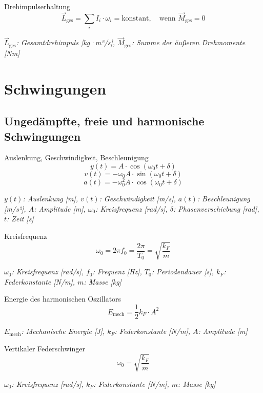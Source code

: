 \documentclass[a4paper,10pt]{article}
\newenvironment{displayformula}
{
	\begin{framed}
		\color{formulaColor}
	}
	{\end{framed}}
\newcommand{\formulalegend}[1]{%
	\par\vspace{0.5ex}%
	{{\color{legendColor}\RaggedRight\small\textit{#1}}}%
	\par\vspace{1.5ex}%
}
\begin{document}
\begin{displayformula}
	Drehimpulserhaltung
	\[
	\vec{L}_{\text{ges}} = \sum_i I_i \cdot \omega_i = \text{konstant}, \quad \text{wenn } \vec{M}_{\text{ges}} = 0
	\]
\end{displayformula}
\formulalegend{
	\( \vec{L}_{\text{ges}} \): Gesamtdrehimpuls [kg·m²/s], \( \vec{M}_{\text{ges}} \): Summe der äußeren Drehmomente [Nm]
}

\section{Schwingungen}

\subsection{Ungedämpfte, freie und harmonische Schwingungen}

\begin{displayformula}
	Auslenkung, Geschwindigkeit, Beschleunigung
	\[
	y(t) = A \cdot \cos(\omega_0 t + \delta)
	\]
	\[
	v(t) = -\omega_0 A \cdot \sin(\omega_0 t + \delta)
	\]
	\[
	a(t) = -\omega_0^2 A \cdot \cos(\omega_0 t + \delta)
	\]
\end{displayformula}
\formulalegend{
	\( y(t) \): Auslenkung [m], \( v(t) \): Geschwindigkeit [m/s], \( a(t) \): Beschleunigung [m/s²], \( A \): Amplitude [m], \( \omega_0 \): Kreisfrequenz [rad/s], \( \delta \): Phasenverschiebung [rad], \( t \): Zeit [s]
}

\begin{displayformula}
	Kreisfrequenz
	\[
	\omega_0 = 2\pi f_0 = \frac{2\pi}{T_0} = \sqrt{\frac{k_F}{m}}
	\]
\end{displayformula}
\formulalegend{
	\( \omega_0 \): Kreisfrequenz [rad/s], \( f_0 \): Frequenz [Hz], \( T_0 \): Periodendauer [s], \( k_F \): Federkonstante [N/m], \( m \): Masse [kg]
}

\begin{displayformula}
	Energie des harmonischen Oszillators
	\[
	E_{\text{mech}} = \frac{1}{2} k_F \cdot A^2
	\]
\end{displayformula}
\formulalegend{
	\( E_{\text{mech}} \): Mechanische Energie [J], \( k_F \): Federkonstante [N/m], \( A \): Amplitude [m]
}

\begin{displayformula}
	Vertikaler Federschwinger
	\[
	\omega_0 = \sqrt{\frac{k_F}{m}}
	\]
\end{displayformula}
\formulalegend{
	\( \omega_0 \): Kreisfrequenz [rad/s], \( k_F \): Federkonstante [N/m], \( m \): Masse [kg]
}
\end{document}
